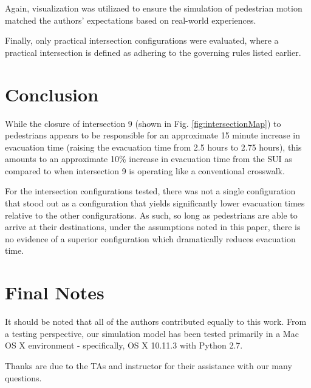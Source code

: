 \documentclass[12pt]{article}
\begin{document}
Again, visualization was utilizaed to ensure the simulation of pedestrian
motion matched the authors' expectations based on real-world experiences.

Finally, only practical intersection configurations were evaluated, where a practical
intersection is defined as adhering to the governing rules listed earlier.

\section{Conclusion}
While the closure of intersection 9 (shown in Fig. \ref{fig:intersectionMap})
to pedestrians appears to be responsible for an approximate 15 minute increase
in evacuation time (raising the evacuation time from 2.5 hours to 2.75 hours),
this amounts to an approximate 10\% increase in evacuation time from the SUI
as compared to when intersection 9 is operating like a conventional crosswalk.

For the intersection configurations tested, there was not a single configuration
that stood out as a configuration that yields significantly lower evacuation
times relative to the other configurations.  As such, so long as pedestrians are able
to arrive at their destinations, under the assumptions noted in this paper,
there is no evidence of a superior configuration which dramatically reduces
evacuation time.

\section{Final Notes}
It should be noted that all of the authors contributed equally to this work.
From a testing perspective, our simulation model has been tested primarily in
a Mac OS X environment - specifically, OS X 10.11.3 with Python 2.7.

Thanks are due to the TAs and instructor for their assistance with our many
questions.

\clearpage
{}

\end{document}
